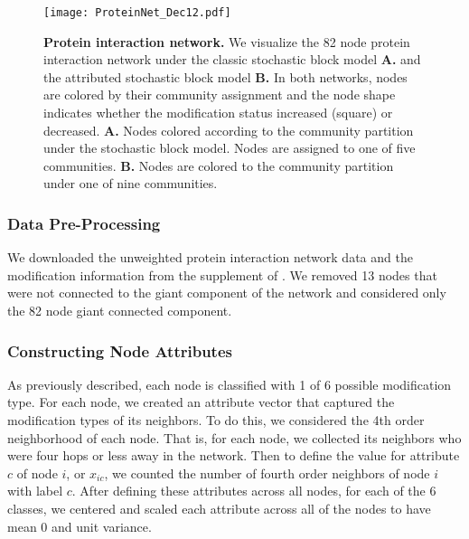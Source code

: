 \begin{figure}[h!]
\begin{center}
\texttt{[image: ProteinNet\_Dec12.pdf]}
\caption{{\bf Protein interaction network.} We visualize the 82 node protein interaction network under the classic stochastic block model {\bf A.} and the attributed stochastic block model {\bf B.} In both networks, nodes are colored by their community assignment and the node shape indicates whether the modification status increased (square) or decreased. {\bf A.} Nodes colored according to the community partition under the stochastic block model. Nodes are assigned to one of five communities. {\bf B.} Nodes are colored to the community partition under one of nine communities.}
\end{center}
\end{figure}

\subsubsection{Data Pre-Processing} We downloaded the unweighted protein interaction network data and the modification information from the supplement of \cite{bonacci}. We removed 13 nodes that were not connected to the giant component of the network and considered only the 82 node giant connected component.

\subsubsection{Constructing Node Attributes}
As previously described, each node is classified with 1 of 6 possible modification type. For each node, we created an attribute vector that captured the modification types of its neighbors. To do this, we considered the 4th order neighborhood of each node. That is, for each node, we collected its neighbors who were four hops or less away in the network. Then to define the value for attribute $c$ of node $i$, or $x_{ic}$, we counted the number of fourth order neighbors of node $i$ with label $c$. After defining these attributes across all nodes, for each of the 6 classes, we centered and scaled each attribute across all of the nodes to have mean 0 and unit variance. 

